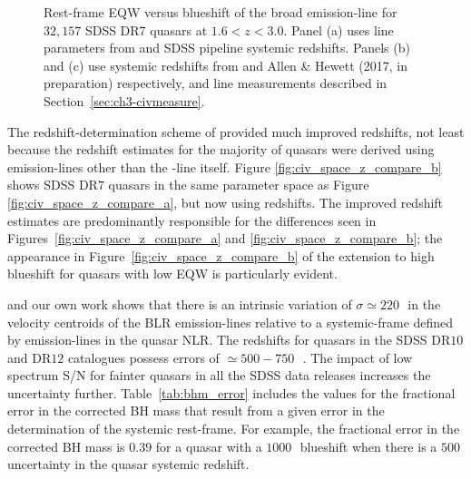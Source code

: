 \begin{figure}
    \caption[{Rest-frame EQW versus blueshift of the broad  emission-line for $32,157$ SDSS DR$7$ quasars at $1.6 < z < 3.0$ using three different redshift estimation schemes.}]{Rest-frame EQW versus blueshift of the broad  emission-line for $32,157$ SDSS DR$7$ quasars at $1.6 < z < 3.0$. Panel (a) uses  line parameters from \citet{shen11} and SDSS pipeline systemic redshifts. Panels (b) and (c) use systemic redshifts from \citet{hewett10} and Allen \& Hewett (2017, in preparation) respectively, and  line measurements described in Section~\ref{sec:ch3-civmeasure}.} 
    \label{fig:civ_space_z_compare}
\end{figure}

The redshift-determination scheme of \citet{hewett10} provided much improved redshifts, not least because the redshift estimates for the majority of quasars were derived using emission-lines other than the -line itself. 
Figure \ref{fig:civ_space_z_compare_b} shows SDSS DR$7$ quasars in the same  parameter space as Figure \ref{fig:civ_space_z_compare_a}, but now using \citet{hewett10} redshifts. 
The improved redshift estimates are predominantly responsible for the differences seen in Figures~\ref{fig:civ_space_z_compare_a} and \ref{fig:civ_space_z_compare_b}; the appearance in Figure~\ref{fig:civ_space_z_compare_b} of the extension to high blueshift for quasars with low  EQW is particularly evident.

\citet{shen16b} and our own work shows that there is an intrinsic variation of $\sigma\simeq220$\,\kms\, in the velocity centroids of the BLR emission-lines relative to a systemic-frame defined by emission-lines in the quasar NLR.
The redshifts for quasars in the SDSS DR$10$ and DR$12$ catalogues \citep{paris14,paris17} possess errors of $\simeq500-750$\,\kms\, \citep{paris12, font-ribera13}. 
The impact of low spectrum S/N for fainter quasars in all the SDSS data releases increases the uncertainty further. 
Table~\ref{tab:bhm_error} includes the values for the fractional error in the corrected BH mass that result from a given error in the determination of the systemic rest-frame. 
For example, the fractional error in the corrected BH mass is $0.39$ for a quasar with a $1000$\,\kms\,  blueshift when there is a $500$\,\kms\, uncertainty in the quasar systemic redshift.   


